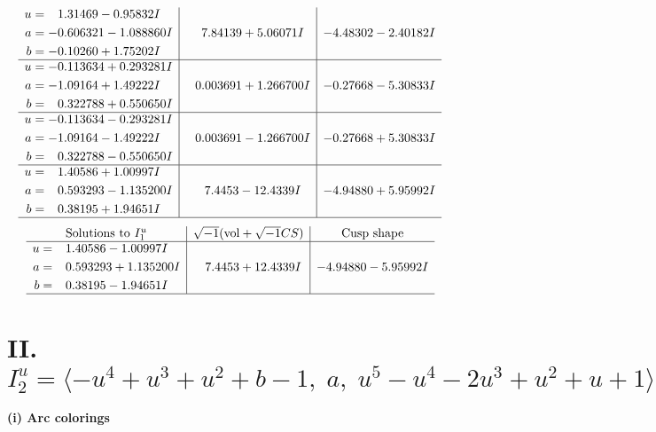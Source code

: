 \documentclass[1p]{elsarticle_modified}
\theoremstyle{definition}
\newcommand{\I}{\sqrt{-1}}
\begin{document}
$$\begin{array}{c|c|c}
\begin{aligned}
u &= \phantom{-}1.31469 - 0.95832 I \\
a &= -0.606321 - 1.088860 I \\
b &= -0.10260 + 1.75202 I\end{aligned}
 & \phantom{-}7.84139 + 5.06071 I & -4.48302 - 2.40182 I \\ \hline\begin{aligned}
u &= -0.113634 + 0.293281 I \\
a &= -1.09164 + 1.49222 I \\
b &= \phantom{-}0.322788 + 0.550650 I\end{aligned}
 & \phantom{-}0.003691 + 1.266700 I & -0.27668 - 5.30833 I \\ \hline\begin{aligned}
u &= -0.113634 - 0.293281 I \\
a &= -1.09164 - 1.49222 I \\
b &= \phantom{-}0.322788 - 0.550650 I\end{aligned}
 & \phantom{-}0.003691 - 1.266700 I & -0.27668 + 5.30833 I \\ \hline\begin{aligned}
u &= \phantom{-}1.40586 + 1.00997 I \\
a &= \phantom{-}0.593293 - 1.135200 I \\
b &= \phantom{-}0.38195 + 1.94651 I\end{aligned}
 & \phantom{-}7.4453 - 12.4339 I & -4.94880 + 5.95992 I\\
 \hline 
 \end{array}$$\newpage$$\begin{array}{c|c|c}  
\text{Solutions to }I^u_{1}& \I (\text{vol} + \sqrt{-1}CS) & \text{Cusp shape}\\
 \hline 
\begin{aligned}
u &= \phantom{-}1.40586 - 1.00997 I \\
a &= \phantom{-}0.593293 + 1.135200 I \\
b &= \phantom{-}0.38195 - 1.94651 I\end{aligned}
 & \phantom{-}7.4453 + 12.4339 I & -4.94880 - 5.95992 I\\
 \hline 
 \end{array}$$\newpage\newpage\renewcommand{\arraystretch}{1}
\centering \section*{II. $I^u_{2}= \langle - u^4+u^3+u^2+b-1,\;a,\;u^5- u^4-2 u^3+u^2+u+1 \rangle$}
\flushleft \textbf{(i) Arc colorings}\\
\end{document}
